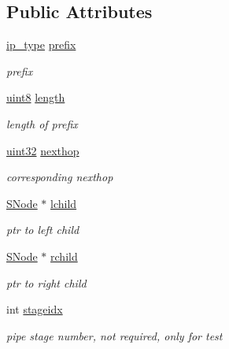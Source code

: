 \subsection*{Public Attributes}
\begin{DoxyCompactItemize}
\item 
\hyperlink{structSNode_a1ab678513fb60d997a93e2cff3d45f3b}{ip\-\_\-type} \hyperlink{structSNode_a3fa37cdc5c85a39d13b1c008d80004b2}{prefix}
\begin{DoxyCompactList}\small\item\em prefix \end{DoxyCompactList}\item 
\hyperlink{types_8h_a34ecedcf03a70dc91e4616212d79267d}{uint8} \hyperlink{structSNode_a26a41fee7f633ec3c1cde1b53d3dd991}{length}
\begin{DoxyCompactList}\small\item\em length of prefix \end{DoxyCompactList}\item 
\hyperlink{types_8h_abd01e8e67e3d94cab04ecaaf4f85ac1b}{uint32} \hyperlink{structSNode_a37372530de83477ae96a73ba352ec7ef}{nexthop}
\begin{DoxyCompactList}\small\item\em corresponding nexthop \end{DoxyCompactList}\item 
\hyperlink{structSNode}{S\-Node} $\ast$ \hyperlink{structSNode_a8b3c44ff242d9eca3b0e2503b857b133}{lchild}
\begin{DoxyCompactList}\small\item\em ptr to left child \end{DoxyCompactList}\item 
\hyperlink{structSNode}{S\-Node} $\ast$ \hyperlink{structSNode_a215bae442818d32f7d03b6986e191285}{rchild}
\begin{DoxyCompactList}\small\item\em ptr to right child \end{DoxyCompactList}\item 
int \hyperlink{structSNode_a7dc9daff31e9d8fb8b683942dadef134}{stageidx}
\begin{DoxyCompactList}\small\item\em pipe stage number, not required, only for test \end{DoxyCompactList}\end{DoxyCompactItemize}
